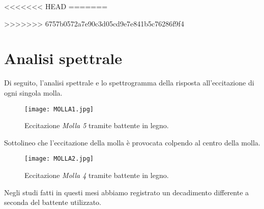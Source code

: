 <<<<<<< HEAD
=======
\clearpage


>>>>>>> 6757b0572a7e90c3d05cd9e7e841b5c76286f9f4
\section{Analisi spettrale}

Di seguito, l'analisi spettrale e lo spettrogramma della risposta all'eccitazione di ogni singola molla. 

\begin{figure}[!h]
\begin{center}
\texttt{[image: MOLLA1.jpg]}
\caption{Eccitazione \textit{Molla 5} tramite battente in legno.}
\label{default}
\end{center}
\end{figure}

Sottolineo che l'eccitazione della molla è provocata colpendo al centro della molla. 

\begin{figure}[!h]
\begin{center}
\texttt{[image: MOLLA2.jpg]}
\caption{Eccitazione \textit{Molla 4} tramite battente in legno.}
\label{default}
\end{center}
\end{figure}

Negli studi fatti in questi mesi abbiamo registrato un decadimento differente a seconda del battente utilizzato.


